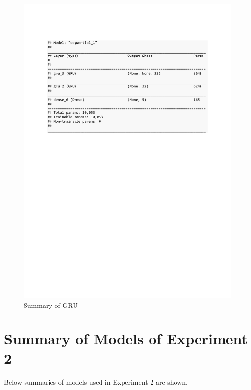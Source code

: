 \begin{figure}[h]
	\centering
	\includegraphics[scale=0.5]{Figures/summary_GRU_pred_syn}
	\decoRule
	\caption[Experiment 1: Summary of GRU for unsupervised learning]{Summary of GRU \parencite{own}}
	\label{fig:summary_GRU_pred_syn}
\end{figure}

\clearpage

\section{Summary of Models of Experiment 2} \label{exp2_summary}

Below summaries of models used in Experiment 2 are shown.

